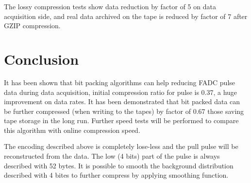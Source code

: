 \documentclass[12pt]{article}
\begin{document}
The lossy compression tests show data reduction by factor of 5 on data acquisition side,
and real data archived on the tape is reduced by factor of 7 after GZIP compression.


\section{Conclusion}

It has been shown that bit packing algorithms can help reducing FADC pulse data during data
acquisition, initial compression ratio for pulse is 0.37, a huge improvement on data rates. It has
been demonstrated that bit packed data can be further compressed (when writing to the tapes)
by factor of 0.67 those saving tape storage in the long run. Further speed tests will be performed 
to compare this algorithm with online compression speed.

The encoding described above is completely lose-less and the pull pulse will be reconstructed 
from the data. The low (4 bits) part of the pulse is always described with 52 bytes. It is possible
to smooth the background distribution described with 4 bites to further compress by applying 
smoothing function. 
\end{document}

